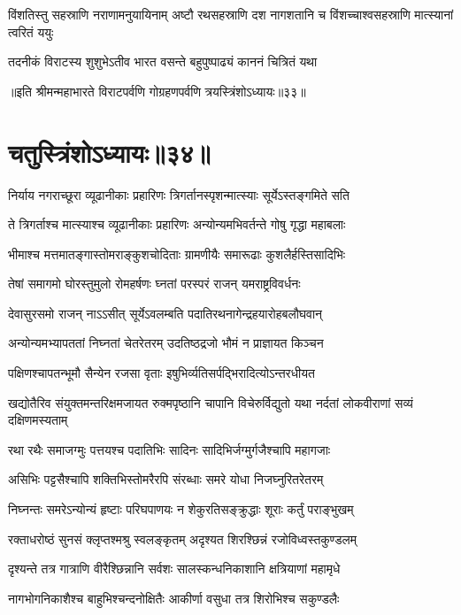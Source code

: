 \threelineshloka
{विंशतिस्तु सहस्राणि नराणामनुयायिनाम्}
{अष्टौ रथसहस्राणि दश नागशतानि च}
{विंशच्चाश्वसहस्राणि मात्स्यानां त्वरितं ययुः}


\twolineshloka
{तदनीकं विराटस्य शुशुभेऽतीव भारत}
{वसन्ते बहुपुष्पाढ्यं काननं चित्रितं यथा}

॥इति श्रीमन्महाभारते विराटपर्वणि गोग्रहणपर्वणि त्रयस्त्रिंशोऽध्यायः॥३३॥

\chapter{चतुस्त्रिंशोऽध्यायः॥३४॥}

\twolineshloka
{निर्याय नगराच्छूरा व्यूढानीकाः प्रहारिणः}
{त्रिगर्तानस्पृशन्मात्स्याः सूर्येऽस्तङ्गमिते सति}


\twolineshloka
{ते त्रिगर्ताश्च मात्स्याश्च व्यूढानीकाः प्रहारिणः}
{अन्योन्यमभिवर्तन्ते गोषु गृद्धा महाबलाः}


\twolineshloka
{भीमाश्च मत्तमातङ्गास्तोमराङ्कुशचोदिताः}
{ग्रामणीयैः समारूढाः कुशलैर्हस्तिसादिभिः}


\twolineshloka
{तेषां समागमो घोरस्तुमुलो रोमहर्षणः}
{घ्नतां परस्परं राजन् यमराष्ट्रविवर्धनः}


\twolineshloka
{देवासुरसमो राजन् नाऽऽसीत् सूर्येऽवलम्बति}
{पदातिरथनागेन्द्रहयारोहबलौघवान्}


\twolineshloka
{अन्योन्यमभ्यापततां निघ्नतां चेतरेतरम्}
{उदतिष्ठद्रजो भौमं न प्राज्ञायत किञ्चन}


\twolineshloka
{पक्षिणश्चापतन्भूमौ सैन्येन रजसा वृताः}
{इषुभिर्व्यतिसर्पद्भिरादित्योऽन्तरधीयत}


\onelineshloka
{खद्योतैरिव संयुक्तमन्तरिक्षमजायत}
\twolineshloka
{रुक्मपृष्ठानि चापानि विचेरुर्विद्युतो यथा}
{नर्दतां लोकवीराणां सव्यं दक्षिणमस्यताम्}


\twolineshloka
{रथा रथैः समाजग्मुः पत्तयश्च पदातिभिः}
{सादिनः सादिभिर्जग्मुर्गजैश्चापि महागजाः}


\twolineshloka
{असिभिः पट्टसैश्चापि शक्तिभिस्तोमरैरपि}
{संरब्धाः समरे योधा निजघ्नुरितरेतरम्}


\twolineshloka
{निघ्नन्तः समरेऽन्योन्यं हृष्टाः परिघपाणयः}
{न शेकुरतिसङ्क्रुद्धाः शूराः कर्तुं पराङ्भुखम्}


\twolineshloka
{रक्ताधरोष्ठं सुनसं क्लृप्तश्मश्रु स्वलङ्कृतम्}
{अदृश्यत शिरश्छिन्नं रजोविध्वस्तकुण्डलम्}


\twolineshloka
{दृश्यन्ते तत्र गात्राणि वीरैश्छिन्नानि सर्वशः}
{सालस्कन्धनिकाशानि क्षत्रियाणां महामृधे}


\twolineshloka
{नागभोगनिकाशैश्च बाहुभिश्चन्दनोक्षितैः}
{आकीर्णा वसुधा तत्र शिरोभिश्च सकुण्डलैः}


